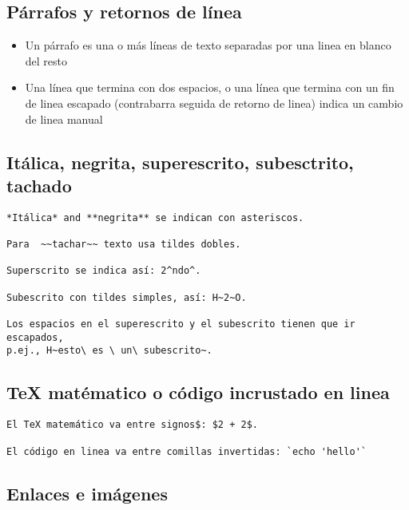 \documentclass[12pt,spanish,]{article}
\providecommand{\tightlist}{%
  \setlength{\itemsep}{0pt}\setlength{\parskip}{0pt}}
\begin{document}
\subsection{Párrafos y retornos de
línea}\label{puxe1rrafos-y-retornos-de-luxednea}

\begin{itemize}
\tightlist
\item
  Un párrafo es una o más líneas de texto separadas por una linea en
  blanco del resto
\item
  Una línea que termina con dos espacios, o una línea que termina con un
  fin de linea escapado (contrabarra seguida de retorno de linea) indica
  un cambio de linea manual
\end{itemize}

\subsection{Itálica, negrita, superescrito, subesctrito,
tachado}\label{ituxe1lica-negrita-superescrito-subesctrito-tachado}

\begin{verbatim}
*Itálica* and **negrita** se indican con asteriscos.

Para  ~~tachar~~ texto usa tildes dobles.

Superscrito se indica así: 2^ndo^.

Subescrito con tildes simples, así: H~2~O.

Los espacios en el superescrito y el subescrito tienen que ir escapados,
p.ej., H~esto\ es \ un\ subescrito~.
\end{verbatim}

\subsection{TeX matématico o código incrustado en
linea}\label{tex-matuxe9matico-o-cuxf3digo-incrustado-en-linea}

\begin{verbatim}
El TeX matemático va entre signos$: $2 + 2$.

El código en linea va entre comillas invertidas: `echo 'hello'`
\end{verbatim}

\subsection{Enlaces e imágenes}\label{enlaces-e-imuxe1genes}
\end{document}
